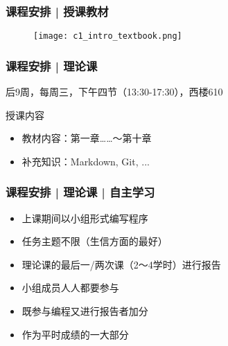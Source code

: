 \begin{frame}
  \frametitle{课程安排 | 授课教材}
  \begin{figure}
    \centering
    \texttt{[image: c1\_intro\_textbook.png]}
  \end{figure}
\end{frame}

\begin{frame}
  \frametitle{课程安排 | 理论课}
  \begin{center}
  \alert{后9周，每周三，下午四节（13:30-17:30），西楼610}\\
  \vspace{0.2cm}
  \end{center}
  \begin{block}{授课内容}
    \begin{itemize}
      \item 教材内容：第一章……～第十章
      \item 补充知识：Markdown, Git, ...
    \end{itemize}
  \end{block}
\end{frame}

\begin{frame}
  \frametitle{课程安排 | 理论课 | 自主学习}
  \begin{itemize}
    \item 上课期间以小组形式编写程序
    \item 任务主题不限（生信方面的最好）
    \item 理论课的最后一/两次课（2～4学时）进行报告
    \item 小组成员人人都要参与
    \item 既参与编程又进行报告者加分
    \item 作为平时成绩的一大部分
  \end{itemize}
\end{frame}

